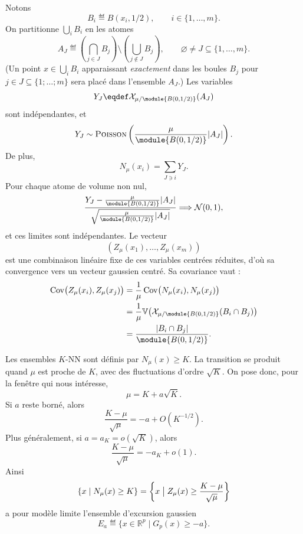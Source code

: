 \begin{Preuve}
Notons
\[
    B_i \eqdef B(x_i,1/2),
    \qquad i\in\{1,\ldots,m\}.
\]
On partitionne $\bigcup_i B_i$ en les atomes
\[
    A_J
    \eqdef
    \left(\bigcap_{j\in J}B_j\right)
    \setminus
    \left(\bigcup_{j\notin J}B_j\right),
    \qquad
    \varnothing\neq J\subseteq\{1,\ldots,m\}.
\]
(Un point $x \in \bigcup_i B_i$ apparaissant \emph{exactement} dans les boules $B_j$ pour $j \in J \subseteq\bigl\{ 1 ; \ldots ; m\bigr\}$ sera placé dans l'ensemble $A_J$.)
Les variables
\[
    Y_J\eqdef \mathcal X_{\mu/\module{B(0,1/2)}}(A_J)
\]
sont indépendantes, et
\[
    Y_J\sim \operatorname{\textsc{Poisson}}\left(\frac{\mu}{\module{B(0,1/2)}}|A_J|\right).
\]
De plus,
\[
    N_\mu(x_i)=\sum_{J\ni i}Y_J.
\]
Pour chaque atome de volume non nul,
\[
    \frac{Y_J-\frac{\mu}{\module{B(0,1/2)}}|A_J|}
         {\sqrt{\frac{\mu}{\module{B(0,1/2)}}|A_J|}}
    \Longrightarrow
    \mathcal N(0,1),
\]
et ces limites sont indépendantes. Le vecteur
\[
    \left(Z_\mu(x_1),\ldots,Z_\mu(x_m)\right)
\]
est une combinaison linéaire fixe de ces variables centrées réduites, d'où sa convergence vers un vecteur gaussien centré. Sa covariance vaut :
\[
\begin{split}
    \operatorname{Cov}\bigl(Z_\mu(x_i),Z_\mu(x_j)\bigr)
    &=
    \frac1\mu
    \operatorname{Cov}\bigl(N_\mu(x_i),N_\mu(x_j)\bigr)\\
    &=
    \frac1\mu
    \mathbb V \bigl(\mathcal X_{\mu/\module{B(0,1/2)}}(B_i\cap B_j)\bigr)\\
    &=
    \frac{|B_i\cap B_j|}{\module{B(0,1/2)}}.
\end{split}
\]
\end{Preuve}

Les ensembles $K$-NN sont définis par $N_\mu(x) \ge K$. La transition se produit quand $\mu$ est proche de $K$, avec des fluctuations d'ordre $\sqrt K$. On pose donc, pour la fenêtre qui nous intéresse,
\[
    \mu = K+a\sqrt K.
\]
Si $a$ reste borné, alors
\[
    \frac{K-\mu}{\sqrt\mu}
    =
    -a+O(K^{-1/2}).
\]
Plus généralement, si $a=a_K=o(\sqrt K)$, alors
\[
    \frac{K-\mu}{\sqrt\mu}
    =
    -a_K+o(1).
\]
Ainsi
\[
    \{x \mid N_\mu(x)\ge K\}
    =
    \left\{
        x \bigm| Z_\mu(x)\ge \frac{K-\mu}{\sqrt\mu}
    \right\}
\]
a pour modèle limite l'ensemble d'excursion gaussien
\[
    E_a
    \eqdef
    \{x\in\mathbb R^p \mid G_p(x)\ge -a\}.
\]


